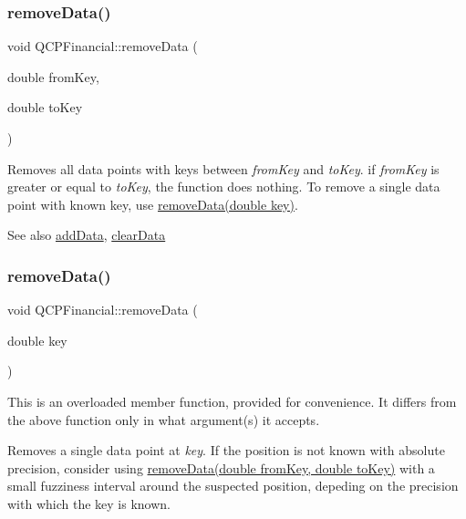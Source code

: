 \subsubsection{\texorpdfstring{remove\+Data()}{removeData()}\hspace{0.1cm}{\footnotesize\ttfamily [1/2]}}
{\footnotesize\ttfamily void Q\+C\+P\+Financial\+::remove\+Data (\begin{DoxyParamCaption}\item[{double}]{from\+Key,  }\item[{double}]{to\+Key }\end{DoxyParamCaption})}

Removes all data points with keys between {\itshape from\+Key} and {\itshape to\+Key}. if {\itshape from\+Key} is greater or equal to {\itshape to\+Key}, the function does nothing. To remove a single data point with known key, use \hyperlink{class_q_c_p_financial_ae527d8a11290906b083d1ab598c380ea}{remove\+Data(double key)}.

\begin{DoxySeeAlso}{See also}
\hyperlink{class_q_c_p_financial_a1a83396f97fcc68f2b7aa8d9782feffe}{add\+Data}, \hyperlink{class_q_c_p_financial_a11fd49928c33e55e27b7319c6927864a}{clear\+Data} 
\end{DoxySeeAlso}
\hypertarget{class_q_c_p_financial_ae527d8a11290906b083d1ab598c380ea}{}\label{class_q_c_p_financial_ae527d8a11290906b083d1ab598c380ea} 
\subsubsection{\texorpdfstring{remove\+Data()}{removeData()}\hspace{0.1cm}{\footnotesize\ttfamily [2/2]}}
{\footnotesize\ttfamily void Q\+C\+P\+Financial\+::remove\+Data (\begin{DoxyParamCaption}\item[{double}]{key }\end{DoxyParamCaption})}

This is an overloaded member function, provided for convenience. It differs from the above function only in what argument(s) it accepts.

Removes a single data point at {\itshape key}. If the position is not known with absolute precision, consider using \hyperlink{class_q_c_p_financial_a048c741d3c8cc5709c2c44b759fdf27c}{remove\+Data(double from\+Key, double to\+Key)} with a small fuzziness interval around the suspected position, depeding on the precision with which the key is known.

